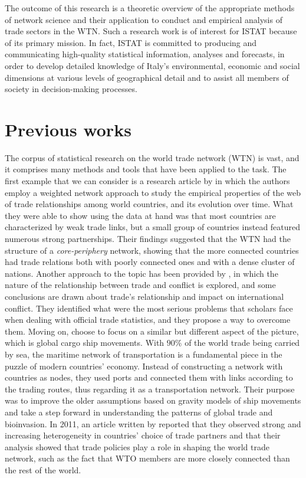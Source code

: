 The outcome of this research is a theoretic overview of the appropriate methods of network science and their application to conduct and empirical analysis of trade sectors in the WTN. Such a research work is of interest for ISTAT because of its primary mission. In fact, ISTAT is committed to producing and communicating high-quality statistical information, analyses and forecasts, in order to develop detailed knowledge of Italy’s environmental, economic and social dimensions at various levels of geographical detail and to assist all members of society in decision-making processes.

\section{Previous works}

The corpus of statistical research on the world trade network (WTN) is vast, and it comprises many methods and tools that have been applied to the task. The first example that we can consider is a research article by \textcite{fagiolo2010evolution} in which the authors employ a weighted network approach to study the empirical properties of the web of trade relationships among world countries, and its evolution over time. What they were able to show using the data at hand was that most countries are characterized by weak trade links, but a small group of countries instead featured numerous strong partnerships. Their findings suggested that the WTN had the structure of a \textit{core-periphery} network, showing that the more connected countries had trade relations both with poorly connected ones and with a dense cluster of nations. Another approach to the topic has been provided by \textcite{barbieri2009conflict}, in which the nature of the relationship between trade and conflict is explored, and some conclusions are drawn about trade's relationship and impact on international conflict. They identified what were the most serious problems that scholars face when dealing with official trade statistics, and they propose a way to overcome them.
Moving on, \textcite{kaluza2010complex} choose to focus on a similar but different aspect of the picture, which is global cargo ship movements. With $90\%$ of the world trade being carried by sea, the maritime network of transportation is a fundamental piece in the puzzle of modern countries' economy. Instead of constructing a network with countries as nodes, they used ports and connected them with links according to the trading routes, thus regarding it as a transportation network. Their purpose was to improve the older assumptions based on gravity models of ship movements and take a step forward in understanding the patterns of global trade and bioinvasion. In 2011, an article written by \textcite{benedictis2011world} reported that they observed strong and increasing heterogeneity in countries' choice of trade partners and that their analysis showed that trade policies play a role in shaping the world trade network, such as the fact that WTO members are more closely connected than the rest of the world. 
